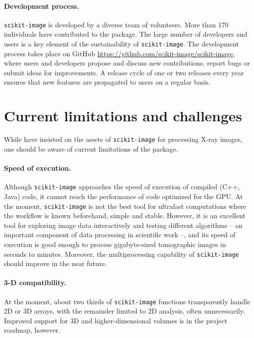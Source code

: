 \documentclass[twocolumn]{bmcart}%
\begin{document}
\paragraph{Development process.}

\texttt{scikit-image} is developed by a diverse team of volunteers.
More than 170 individuals have contributed to the package. The large
number of developers and users is a key element of the sustainability of
\texttt{scikit-image}. The
development process takes place on GitHub
\url{https://github.com/scikit-image/scikit-image}, where users and
developers propose and discuss new contributions, report bugs or submit ideas
for improvements.
A release cycle of one or two releases every year
ensures that new features are propagated to users on a regular basis.

\section*{Current limitations and challenges}

While have insisted on the assets of \texttt{scikit-image} for processing
X-ray images, one should be aware of current limitations of the package.

\paragraph{Speed of execution.} Although \texttt{scikit-image} approaches
the speed of execution of compiled (C++, Java) code, it cannot reach the
performance of code optimized for the GPU. At the moment,
\texttt{scikit-image} is not the best tool for ultrafast computations
where the workflow is known beforehand, simple and stable. However, it is
an excellent tool for exploring image data interactively and testing
different algorithms -- an important component of data processing in
scientific work --, and its speed of execution is good enough to process
gigabyte-sized tomographic images in seconds to minutes. Moreover,
the multiprocessing capability of \texttt{scikit-image} should improve in
the near future.

\paragraph{3-D compatibility.} At the moment, about two thirds of
\texttt{scikit-image} functions transparently handle 2D or 3D arrays, with
the remainder limited to 2D analysis, often unnecessarily. Improved support
for 3D and higher-dimensional volumes is in the project roadmap, however.
\end{document}
